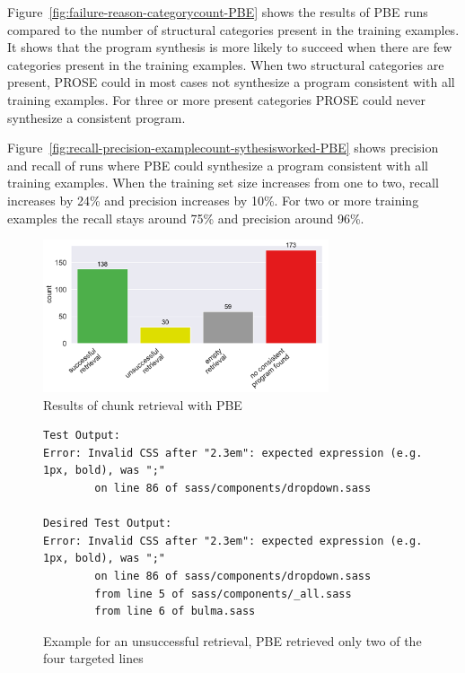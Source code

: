 \documentclass[\myrootdir/main.tex]{subfiles}
\begin{document}
Figure~\ref{fig:failure-reason-categorycount-PBE} shows the results of PBE runs compared to the number of structural categories present in the training examples.
It shows that the program synthesis is more likely to succeed when there are few categories present in the training examples.
When two structural categories are present, PROSE could in most cases not synthesize a program consistent with all training examples.
For three or more present categories PROSE could never synthesize a consistent program.

Figure~\ref{fig:recall-precision-examplecount-sythesisworked-PBE} shows precision and recall of runs where PBE could synthesize a program consistent with all training examples.
When the training set size increases from one to two, recall increases by 24\% and precision increases by 10\%.
For two or more training examples the recall stays around 75\% and precision around 96\%.

\begin{figure}[htbp]
		\centering
		\includegraphics[width=0.75\textwidth, clip]{img/big-study/failure-reason-PBE.pdf}
		\caption{Results of chunk retrieval with PBE}
		\label{fig:failure-reason-PBE}
\end{figure}

\begin{figure}[]
  \centering
  \begin{lstlisting}[breaklines=true]
Test Output:
Error: Invalid CSS after "2.3em": expected expression (e.g. 1px, bold), was ";"
        on line 86 of sass/components/dropdown.sass   

Desired Test Output:
Error: Invalid CSS after "2.3em": expected expression (e.g. 1px, bold), was ";"
        on line 86 of sass/components/dropdown.sass
        from line 5 of sass/components/_all.sass
        from line 6 of bulma.sass
  \end{lstlisting}  
  \caption{Example for an unsuccessful retrieval, PBE retrieved only two of the four targeted lines}
  \label{lst:system-log}
\end{figure}
\end{document}
